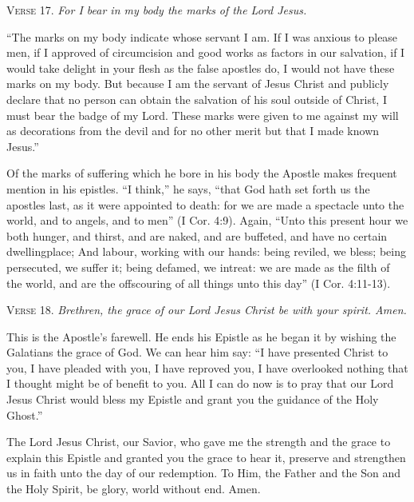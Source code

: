 \textsc{Verse} 17. \emph{For I bear in my body the marks of the Lord Jesus.}

“The marks on my body indicate whose servant I am. If I was anxious to please men, if I approved of circumcision and good works as factors in our salvation, if I would take delight in your flesh as the false apostles do, I would not have these marks on my body. But because I am the servant of Jesus Christ and publicly declare that no person can obtain the salvation of his soul outside of Christ, I must bear the badge of my Lord. These marks were given to me against my will as decorations from the devil and for no other merit but that I made known Jesus.”

Of the marks of suffering which he bore in his body the Apostle makes frequent mention in his epistles. “I think,” he says, “that God hath set forth us the apostles last, as it were appointed to death: for we are made a spectacle unto the world, and to angels, and to men” (I Cor. 4:9). Again, “Unto this present hour we both hunger, and thirst, and are naked, and are buffeted, and have no certain dwellingplace; And labour, working with our hands: being reviled, we bless; being persecuted, we suffer it; being defamed, we intreat: we are made as the filth of the world, and are the offscouring of all things unto this day” (I Cor. 4:11-13).

\textsc{Verse} 18. \emph{Brethren, the grace of our Lord Jesus Christ be with your spirit. Amen.}

This is the Apostle’s farewell. He ends his Epistle as he began it by wishing the Galatians the grace of God. We can hear him say: “I have presented Christ to you, I have pleaded with you, I have reproved you, I have overlooked nothing that I thought might be of benefit to you. All I can do now is to pray that our Lord Jesus Christ would bless my Epistle and grant you the guidance of the Holy Ghost.”

The Lord Jesus Christ, our Savior, who gave me the strength and the grace to explain this Epistle and granted you the grace to hear it, preserve and strengthen us in faith unto the day of our redemption. To Him, the Father and the Son and the Holy Spirit, be glory, world without end. Amen.
